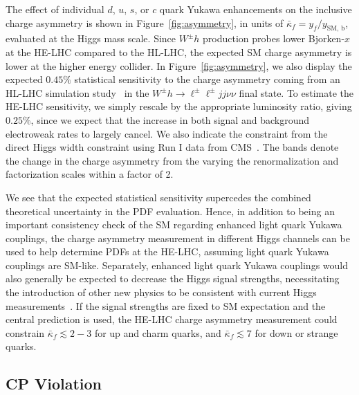 \documentclass[../report.tex]{subfiles}
\begin{document}
The effect of individual $d$, $u$, $s$, or $c$ quark Yukawa
enhancements on the inclusive charge asymmetry is shown in
Figure~\ref{fig:asymmetry}, in units of $\bar{\kappa}_f = y_f /
y_{\text{SM, b}}$, evaluated at the Higgs mass scale.  Since $W^\pm h$
production probes lower Bjorken-$x$ at the HE-LHC compared to the
HL-LHC, the expected SM charge asymmetry is lower at the higher energy
collider.  In Figure~\ref{fig:asymmetry}, we also display the expected
$0.45\%$ statistical sensitivity to the charge asymmetry coming from
an HL-LHC simulation study~\cite{Yu:2016rvv} in the $W^\pm h \to
\ell^\pm \ell^\pm jj \nu \nu$ final state.  To estimate the HE-LHC
sensitivity, we simply rescale by the appropriate luminosity ratio,
giving $0.25\%$, since we expect that the increase in both signal and
background electroweak rates to largely cancel.  We also indicate the
constraint from the direct Higgs width constraint using Run I data
from CMS~\cite{Yu:2016rvv}.  The bands denote the change in the charge
asymmetry from the varying the renormalization and factorization
scales within a factor of 2.

We see that the expected statistical sensitivity supercedes the
combined theoretical uncertainty in the PDF evaluation.  Hence, in
addition to being an important consistency check of the SM regarding
enhanced light quark Yukawa couplings, the charge asymmetry
measurement in different Higgs channels can be used to help determine
PDFs at the HE-LHC, assuming light quark Yukawa couplings are SM-like.
Separately, enhanced light quark Yukawa couplings would also generally
be expected to decrease the Higgs signal strengths, necessitating the
introduction of other new physics to be consistent with current Higgs
measurements~\cite{Yu:2016rvv}.  If the signal strengths are fixed to
SM expectation and the central prediction is used, the HE-LHC charge
asymmetry measurement could constrain $\bar{\kappa}_f \lesssim 2-3$
for up and charm quarks, and $\bar{\kappa}_f \lesssim 7$ for down or
strange quarks.





\subsection{CP Violation}

\end{document}
